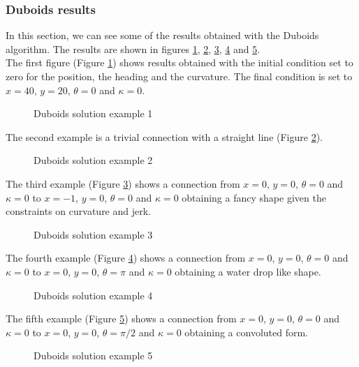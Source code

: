 \documentclass[11pt,twocolumn]{scrartcl}
\begin{document}
\subsubsection*{Duboids results}
%
In this section, we can see some of the results obtained with the Duboids algorithm. The results are shown in figures \ref{fig:DuboidsRes0}, \ref{fig:DuboidsRes1}, \ref{fig:DuboidsRes2}, \ref{fig:DuboidsRes3} and \ref{fig:DuboidsRes4}.\\
The first figure (Figure \ref{fig:DuboidsRes0}) shows results obtained with the initial condition set to zero for the position, the heading and the curvature. The final condition is set to $x = 40$, $y=20$, $\theta=0$ and $\kappa=0$.\\
%
\begin{figure}[htb!]
  \centering
  \caption{Duboids solution example 1}
  \label{fig:DuboidsRes0}
\end{figure}
%
The second example is a trivial connection with a straight line (Figure \ref{fig:DuboidsRes1}).\\
%
\begin{figure}[htb!]
  \centering
  \caption{Duboids solution example 2}
  \label{fig:DuboidsRes1}
\end{figure}
%
The third example (Figure \ref{fig:DuboidsRes2}) shows a connection from $x=0$, $y=0$, $\theta=0$ and $\kappa=0$ to $x=-1$, $y=0$, $\theta=0$ and $\kappa=0$ obtaining a fancy shape given the constraints on curvature and jerk.\\
%
\begin{figure}[htb!]
  \centering
  \caption{Duboids solution example 3}
  \label{fig:DuboidsRes2}
\end{figure}
%
The fourth example (Figure \ref{fig:DuboidsRes3}) shows a connection from $x=0$, $y=0$, $\theta=0$ and $\kappa=0$ to $x=0$, $y=0$, $\theta=\pi$ and $\kappa=0$ obtaining a water drop like shape.\\
%
\begin{figure}[htb!]
  \centering
  \caption{Duboids solution example 4}
  \label{fig:DuboidsRes3}
\end{figure}
%
The fifth example (Figure \ref{fig:DuboidsRes4}) shows a connection from $x=0$, $y=0$, $\theta=0$ and $\kappa=0$ to $x=0$, $y=0$, $\theta=\pi/2$ and $\kappa=0$ obtaining a convoluted form.\\
%
\begin{figure}[htb!]
  \centering
  \caption{Duboids solution example 5}
  \label{fig:DuboidsRes4}
\end{figure}
%
\end{document}
